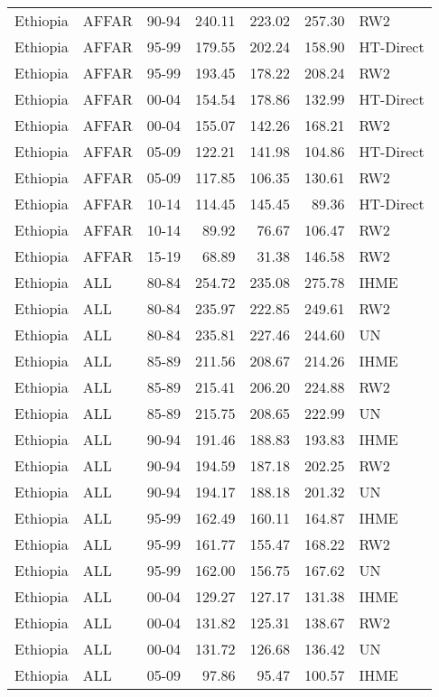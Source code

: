 \begin{longtable}{lllrrrl}
  Ethiopia & AFFAR & 90-94 & 240.11 & 223.02 & 257.30 & RW2 \\ 
  Ethiopia & AFFAR & 95-99 & 179.55 & 202.24 & 158.90 & HT-Direct \\ 
  Ethiopia & AFFAR & 95-99 & 193.45 & 178.22 & 208.24 & RW2 \\ 
  Ethiopia & AFFAR & 00-04 & 154.54 & 178.86 & 132.99 & HT-Direct \\ 
  Ethiopia & AFFAR & 00-04 & 155.07 & 142.26 & 168.21 & RW2 \\ 
  Ethiopia & AFFAR & 05-09 & 122.21 & 141.98 & 104.86 & HT-Direct \\ 
  Ethiopia & AFFAR & 05-09 & 117.85 & 106.35 & 130.61 & RW2 \\ 
  Ethiopia & AFFAR & 10-14 & 114.45 & 145.45 & 89.36 & HT-Direct \\ 
  Ethiopia & AFFAR & 10-14 & 89.92 & 76.67 & 106.47 & RW2 \\ 
  Ethiopia & AFFAR & 15-19 & 68.89 & 31.38 & 146.58 & RW2 \\ 
  Ethiopia & ALL & 80-84 & 254.72 & 235.08 & 275.78 & IHME \\ 
  Ethiopia & ALL & 80-84 & 235.97 & 222.85 & 249.61 & RW2 \\ 
  Ethiopia & ALL & 80-84 & 235.81 & 227.46 & 244.60 & UN \\ 
  Ethiopia & ALL & 85-89 & 211.56 & 208.67 & 214.26 & IHME \\ 
  Ethiopia & ALL & 85-89 & 215.41 & 206.20 & 224.88 & RW2 \\ 
  Ethiopia & ALL & 85-89 & 215.75 & 208.65 & 222.99 & UN \\ 
  Ethiopia & ALL & 90-94 & 191.46 & 188.83 & 193.83 & IHME \\ 
  Ethiopia & ALL & 90-94 & 194.59 & 187.18 & 202.25 & RW2 \\ 
  Ethiopia & ALL & 90-94 & 194.17 & 188.18 & 201.32 & UN \\ 
  Ethiopia & ALL & 95-99 & 162.49 & 160.11 & 164.87 & IHME \\ 
  Ethiopia & ALL & 95-99 & 161.77 & 155.47 & 168.22 & RW2 \\ 
  Ethiopia & ALL & 95-99 & 162.00 & 156.75 & 167.62 & UN \\ 
  Ethiopia & ALL & 00-04 & 129.27 & 127.17 & 131.38 & IHME \\ 
  Ethiopia & ALL & 00-04 & 131.82 & 125.31 & 138.67 & RW2 \\ 
  Ethiopia & ALL & 00-04 & 131.72 & 126.68 & 136.42 & UN \\ 
  Ethiopia & ALL & 05-09 & 97.86 & 95.47 & 100.57 & IHME \\ 

\end{longtable}
